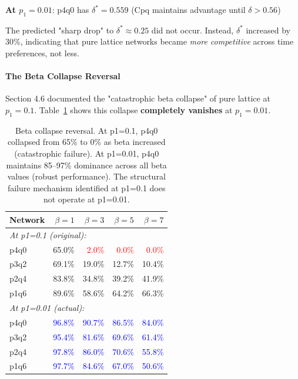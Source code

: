 \documentclass[12pt,a4paper]{article}
\begin{document}
\textbf{At $p_1=0.01$}: p4q0 has $\delta^* = 0.559$ (Cpq maintains advantage until $\delta > 0.56$)

The predicted "sharp drop" to $\delta^* \approx 0.25$ did not occur. Instead, $\delta^*$ increased by 30\%, indicating that pure lattice networks became \textit{more competitive} across time preferences, not less.

\paragraph{The Beta Collapse Reversal}

Section 4.6 documented the "catastrophic beta collapse" of pure lattice at $p_1=0.1$. Table~\ref{tab:beta_reversal} shows this collapse \textbf{completely vanishes} at $p_1=0.01$.

\begin{table}[H]
\centering
\begin{tabular}{@{}lrrrr@{}}
\toprule
\textbf{Network} & \textbf{$\beta=1$} & \textbf{$\beta=3$} & \textbf{$\beta=5$} & \textbf{$\beta=7$} \\
\midrule
\multicolumn{5}{l}{\textit{At p1=0.1 (original):}} \\
p4q0 & 65.0\% & \textcolor{red}{2.0\%} & \textcolor{red}{0.0\%} & \textcolor{red}{0.0\%} \\
p3q2 & 69.1\% & 19.0\% & 12.7\% & 10.4\% \\
p2q4 & 83.8\% & 34.8\% & 39.2\% & 41.9\% \\
p1q6 & 89.6\% & 58.6\% & 64.2\% & 66.3\% \\
\midrule
\multicolumn{5}{l}{\textit{At p1=0.01 (actual):}} \\
p4q0 & \textcolor{blue}{96.8\%} & \textcolor{blue}{90.7\%} & \textcolor{blue}{86.5\%} & \textcolor{blue}{84.0\%} \\
p3q2 & \textcolor{blue}{95.4\%} & \textcolor{blue}{81.6\%} & \textcolor{blue}{69.6\%} & \textcolor{blue}{61.4\%} \\
p2q4 & \textcolor{blue}{97.8\%} & \textcolor{blue}{86.0\%} & \textcolor{blue}{70.6\%} & \textcolor{blue}{55.8\%} \\
p1q6 & \textcolor{blue}{97.7\%} & \textcolor{blue}{84.6\%} & \textcolor{blue}{67.0\%} & \textcolor{blue}{50.6\%} \\
\bottomrule
\end{tabular}
\caption{Beta collapse reversal. At p1=0.1, p4q0 collapsed from 65\% to 0\% as beta increased (catastrophic failure). At p1=0.01, p4q0 maintains 85--97\% dominance across all beta values (robust performance). The structural failure mechanism identified at p1=0.1 does not operate at p1=0.01.}
\label{tab:beta_reversal}
\end{table}
\end{document}
